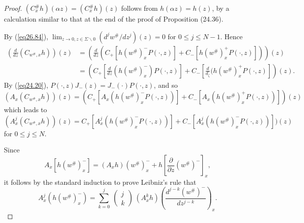 \documentclass{surv-l}
\theoremstyle{plain}
\theoremstyle{definition}
\numberwithin{equation}{chapter}
\begin{document}
\begin{proof}
$(C_{x}^{\#}h)(\alpha z)=(C_{x}^{\#}h)(z)$ follows from $h(\alpha z)=h(z)$, by a calculation similar to that at the end of the proof of Proposition (24.36).

By (\ref{eq26.84}), $\lim_{z\rightarrow 0,z\in\Sigma\backslash 0}(d^{j}w^{\#}/dz^{j})(z)=0$ for $0\leq j\leq N-1$. Hence
\begin{align*}
\left(\frac{d}{dz}(C_{w^{\#},x}h)\right)(z)&=\left(\frac{d}{dz}(C_{+}[h(w^{\#})_{x}^{-}P(\cdot,
z)]+C_{-}[h(w^{\#})_{x}^{+}P(\cdot, z)])\right)(z)\\
&=\left(C_{+}\left[\frac{d}{dz}(h(w^{\#})_{x}^{-})P(\cdot,z)\right]+C_{-}\left[\frac{d}{d_{\zeta}}(h(w^{\#})_{x}^{+}P(\cdot, z)\right]\right)(z).
\end{align*}
By (\ref{eq24.20}), $P(\cdot, z)J_{-}(z)=J_{-}(\cdot)P(\cdot, z)$, and so
\begin{equation*}
(A_{x}(C_{w^{\#},x}h))(z)=(C_{+}[A_{x}(h(w^{\#})_{x}^{-}P(\cdot, z))]+C_{-}[A_{x}(h(w^{\#})_{x}^{+}P(\cdot, z))])(z)
\end{equation*}
which leads to
\begin{equation}\label{eq27.8}
(A_{x}^{j}(C_{w^{\#},x}h))(z)=C_{+}[A_{x}^{j}(h(w^{\#})_{x}^{-}P(\cdot, z))]+C_{-}[A_{x}^{j}(h(w^{\#})_{x}^{-}P(\cdot, z))])(z)
\end{equation}
for $0\leq j\leq N$.

Since
\begin{equation*}
A_{x}[h(w^{\#})_{x}^{-}]=(A_{x}h)(w^{\#})_{x}^{-}+h\left[\frac{\partial}{\partial z}(w^{\#})^{-}\right]_{x},
\end{equation*}
it follows by the standard induction to prove Leibniz's rule that
\begin{equation}\label{eq27.9}
A_{x}^{j}(h(w^{\#})_{x}^{-})=\sum_{k=0}^{j}\ \left(\begin{array}{l}
j\\
k
\end{array}\right)\ (A_{x}^{k}h)\left(\frac{d^{j-k}(w^{\#})^{-}}{dz^{j-k}}\right)_{x}.
\end{equation}


\end{proof}
\end{document}
